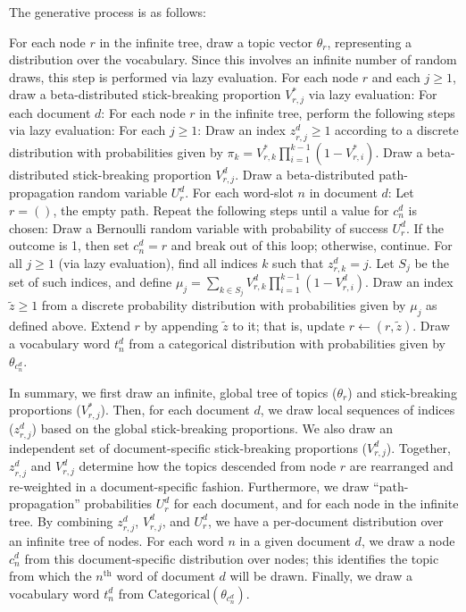 \documentclass{article}
\newcommand{\nth}{^{\text{th}}}
\begin{document}
The generative process is as follows:
\begin{outline}[enumerate]
\1 For each node $r$ in the infinite tree, draw a topic vector $\theta_r$, representing a distribution over the vocabulary.
Since this involves an infinite number of random draws, this step is performed via lazy evaluation.
\1 For each node $r$ and each $j \geq 1$, draw a beta-distributed stick-breaking proportion $V^*_{r,j}$ via lazy evaluation:
\1 For each document $d$:
  \2 For each node $r$ in the infinite tree, perform the following steps via lazy evaluation:
    \3 For each $j \geq 1$:
      \4 Draw an index $z^d_{r,j} \geq 1$ according to a discrete distribution with probabilities given by $\pi_k = V^*_{r,k} \prod_{i=1}^{k-1} (1-V^*_{r,i})$.
      \4 Draw a beta-distributed stick-breaking proportion $V^d_{r,j}$.
    \3 Draw a beta-distributed path-propagation random variable $U^d_r$.
  \2 For each word-slot $n$ in document $d$:
    \3 Let $r = ()$, the empty path.
    \3 Repeat the following steps until a value for $c^d_n$ is chosen:
      \4 Draw a Bernoulli random variable with probability of success $U^d_r$.
      \4 If the outcome is 1, then set $c^d_n = r$ and break out of this loop; otherwise, continue.
      \4 For all $j \geq 1$ (via lazy evaluation), find all indices $k$ such that $z^d_{r,k} = j$.  Let $S_j$ be the set of such indices, and define $\mu_j = \sum_{k \in S_j} V^d_{r,k} \prod_{i=1}^{k-1} (1-V^d_{r,i})$.
      \4 Draw an index $\tilde z \geq 1$ from a discrete probability distribution with probabilities given by $\mu_j$ as defined above.
      \4 Extend $r$ by appending $\tilde z$ to it; that is, update $r \gets (r, \tilde z)$.
    \3 Draw a vocabulary word $t^d_n$ from a categorical distribution with probabilities given by $\theta_{c^d_n}$.
\end{outline}

In summary, we first draw an infinite, global tree of topics ($\theta_r$) and stick-breaking proportions ($V^*_{r,j}$).
Then, for each document $d$, we draw local sequences of indices ($z^d_{r,j}$) based on the global stick-breaking proportions.
We also draw an independent set of document-specific stick-breaking proportions ($V^d_{r,j}$).
Together, $z^d_{r,j}$ and $V^d_{r,j}$ determine how the topics descended from node $r$ are rearranged and re-weighted in a document-specific fashion.
Furthermore, we draw ``path-propagation'' probabilities $U^d_r$ for each document, and for each node in the infinite tree.
By combining $z^d_{r,j}$, $V^d_{r,j}$, and $U^d_r$, we have a per-document distribution over an infinite tree of nodes.
For each word $n$ in a given document $d$, we draw a node $c^d_n$ from this document-specific distribution over nodes;
this identifies the topic from which the $n\nth$ word of document $d$ will be drawn.
Finally, we draw a vocabulary word $t^d_n$ from ${\text{Categorical}(\theta_{c^d_n})}$.
\end{document}
